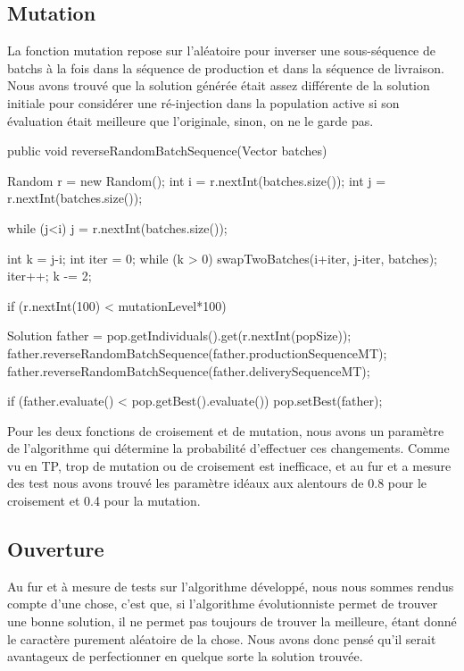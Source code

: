 \vspace{1em}

\subsection{Mutation}
La fonction mutation repose sur l'aléatoire pour inverser une sous-séquence de batchs à la fois dans la séquence de production et dans la séquence de livraison. Nous avons trouvé que la solution générée était assez différente de la solution initiale pour considérer une ré-injection dans la population active si son évaluation était meilleure que l'originale, sinon, on ne le garde pas.
\begin{java}
public void reverseRandomBatchSequence(Vector batches) {
	Random r = new Random();
	int i = r.nextInt(batches.size());
	int j = r.nextInt(batches.size());
	
	while (j<i)
		j = r.nextInt(batches.size());
	
	int k = j-i;
	int iter = 0;
	while (k > 0) {
		swapTwoBatches(i+iter, j-iter, batches);
		iter++;
		k -= 2;
	}
}
\end{java}

\vspace{1em}

\begin{java}
if (r.nextInt(100) < mutationLevel*100) {			
	Solution father = pop.getIndividuals().get(r.nextInt(popSize));
	father.reverseRandomBatchSequence(father.productionSequenceMT);
	father.reverseRandomBatchSequence(father.deliverySequenceMT);
	
	if (father.evaluate() < pop.getBest().evaluate()) 
		pop.setBest(father);
		
}
\end{java}

Pour les deux fonctions de croisement et de mutation, nous avons un paramètre de l'algorithme qui détermine la probabilité d'effectuer ces changements. Comme vu en TP, trop de mutation ou de croisement est inefficace, et au fur et a mesure des test nous avons trouvé les paramètre idéaux aux alentours de 0.8 pour le croisement et 0.4 pour la mutation.

\subsection{Ouverture}
Au fur et à mesure de tests sur l'algorithme développé, nous nous sommes rendus compte d'une chose, c'est que, si l'algorithme évolutionniste permet de trouver une bonne solution, il ne permet pas toujours de trouver la meilleure, étant donné le caractère purement aléatoire de la chose. Nous avons donc pensé qu'il serait avantageux de perfectionner en quelque sorte la solution trouvée.